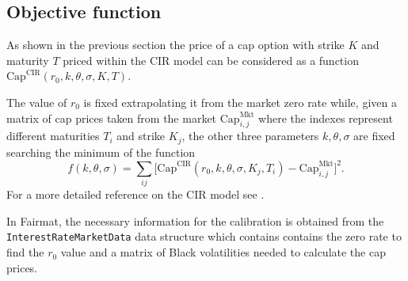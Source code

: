 \subsection{Objective function}

As shown in the previous section the price of a cap option with strike $K$ and maturity $T$ priced within the CIR model can be considered as a function $\mathrm{Cap}^{\mathrm{CIR}}(r_0, k, \theta, \sigma, K, T)$.

The value of $r_0$ is fixed extrapolating it from the market zero rate while, given a matrix of cap prices taken from the market $\mathrm{Cap}^{\mathrm{Mkt}}_{i,j}$ where the indexes represent different maturities $T_i$ and strike $K_j$, the other three parameters $k, \theta, \sigma$ are fixed searching the minimum of the function
\begin{equation}
f(k, \theta, \sigma) = \sum_{ij}\Big[\mathrm{Cap}^{\mathrm{CIR}}(r_0, k, \theta, \sigma, K_j, T_i) - \mathrm{Cap}^{\mathrm{Mkt}}_{i,j}\Big]^2.
\end{equation}
For a more detailed reference on the CIR model see \cite{Brigo:InterestRateModels}.

In Fairmat, the necessary information for the calibration is obtained from the \texttt{InterestRateMarketData} data structure which contains contains the zero rate to find the $r_0$ value and a matrix of Black volatilities needed to  calculate the cap prices.







